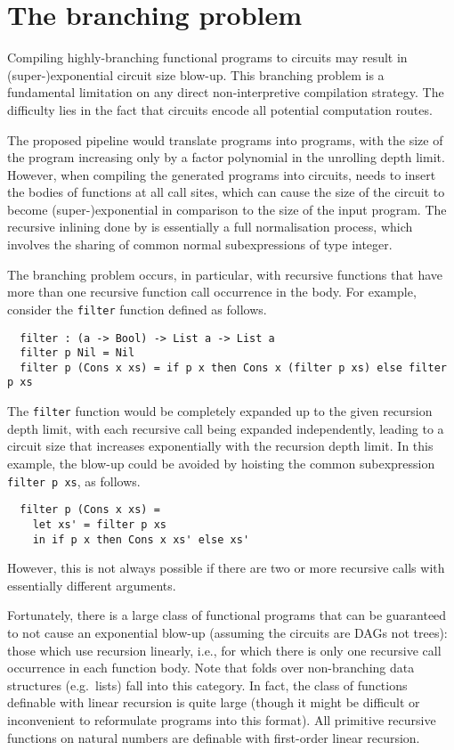 \documentclass[final]{msc}
\begin{document}
\section{The branching problem}\label{sec_branching}

Compiling highly-branching functional programs to circuits may result
in (super-)exponential circuit size blow-up. This branching problem is
a fundamental limitation on any direct non-interpretive compilation
strategy. The difficulty lies in the fact that circuits encode all potential computation routes.

The proposed pipeline would translate \Juvix{} programs into \VampIR{}
programs, with the size of the program increasing only by a factor polynomial in the unrolling depth limit. However, when compiling the generated programs into circuits, \VampIR{} needs to insert the bodies of functions at all call sites, which can cause the size of the circuit to become (super-)exponential in comparison to the size of the \VampIR{} input program. The recursive inlining done by \VampIR{} is essentially a full
normalisation process, which involves the sharing of common normal
subexpressions of type integer.

The branching problem occurs, in particular, with recursive functions
that have more than one recursive function call occurrence in the
body. For example, consider the \texttt{filter} function defined as follows.

\begin{verbatim}
  filter : (a -> Bool) -> List a -> List a
  filter p Nil = Nil
  filter p (Cons x xs) = if p x then Cons x (filter p xs) else filter p xs
\end{verbatim}

The \texttt{filter} function would be completely expanded up to the given 
recursion depth limit, with each recursive call being expanded independently,
leading to a circuit size that increases exponentially with the recursion depth limit.
In this example, the blow-up could be avoided by hoisting the common
subexpression \texttt{filter p xs}, as follows.
\begin{verbatim}
  filter p (Cons x xs) =
    let xs' = filter p xs
    in if p x then Cons x xs' else xs'
\end{verbatim}
However, this is not always possible if there are two or more
recursive calls with essentially different arguments.

Fortunately, there is a large class of functional programs that can be
guaranteed to not cause an exponential blow-up (assuming the circuits
are DAGs not trees): those which use recursion linearly, i.e., for
which there is only one recursive call occurrence in each function
body. Note that folds over non-branching data structures (e.g.~lists)
fall into this category. In fact, the class of functions definable
with linear recursion is quite large (though it might be difficult or
inconvenient to reformulate programs into this format). All primitive
recursive functions on natural numbers are definable with first-order
linear recursion.
\end{document}
